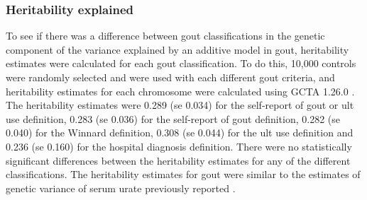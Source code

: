\documentclass[]{report}
\begin{document}
\subsubsection{Heritability explained}\label{heritability-explained}

To see if there was a difference between gout classifications in the
genetic component of the variance explained by an additive model in
gout, heritability estimates were calculated for each gout
classification. To do this, 10,000 controls were randomly selected and
were used with each different gout criteria, and heritability estimates
for each chromosome were calculated using GCTA 1.26.0
\citep{Yang2011part}. The heritability estimates were 0.289
(\acrshort{se} 0.034) for the self-report of gout or \gls{ult} use
definition, 0.283 (\acrshort{se} 0.036) for the self-report of gout
definition, 0.282 (\acrshort{se} 0.040) for the Winnard definition,
0.308 (\acrshort{se} 0.044) for the \gls{ult} use definition and 0.236
(\acrshort{se} 0.160) for the hospital diagnosis definition. There were
no statistically significant differences between the heritability
estimates for any of the different classifications. The heritability
estimates for gout were similar to the estimates of genetic variance of
serum urate previously reported \citep{Kottgen2013}.
\end{document}

